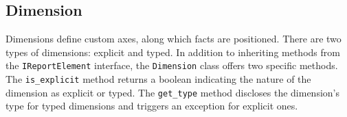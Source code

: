 


\subsection{Dimension}

Dimensions define custom axes, along which facts are positioned.
There are two types of dimensions: explicit and typed.
In addition to inheriting methods from the \texttt{IReportElement} interface,
the \texttt{Dimension} class offers two specific methods.
The \texttt{is\_explicit} method returns a boolean indicating the nature of the dimension
as explicit or typed.
The \texttt{get\_type} method discloses the dimension's type for typed dimensions and triggers an exception for explicit ones.


